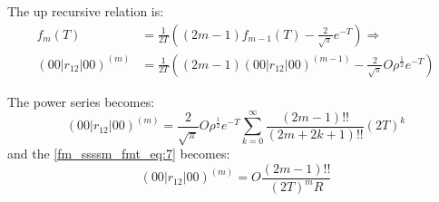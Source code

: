 The up recursive relation is:
\begin{equation}
 \begin{split}
  f_{m}(T) &= \frac{1}{2T}\left( (2m-1)f_{m-1}(T) - \frac{2}{\sqrt{\pi}}e^{-T}\right) 
  \Rightarrow \\    
  (00|r_{12}|00)^{(m)} &= \frac{1}{2T}\left( (2m-1)(00|r_{12}|00)^{(m-1)} - 
  \frac{2}{\sqrt{\pi}}O\rho^{\frac{1}{2}}e^{-T}\right)
 \end{split}
 \label{fm_ssssm_eq:5}
\end{equation}

The power series becomes:
\begin{equation}
  (00|r_{12}|00)^{(m)} = \frac{2}{\sqrt{\pi}}O\rho^{\frac{1}{2}}e^{-T}
  \sum_{k=0}^{\infty}\frac{(2m-1)!!}{(2m+2k+1)!!}(2T)^{k}
 \label{fm_ssssm_eq:6}
\end{equation}
and the \ref{fm_ssssm_fmt_eq:7} becomes:
\begin{equation}
 \label{fm_ssssm_fmt_eq:7}
 (00|r_{12}|00)^{(m)} = O\frac{(2m-1)!!}{(2T)^{m}R}
\end{equation}


